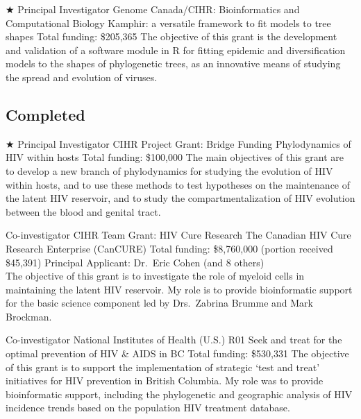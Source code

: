 \documentclass[11pt]{moderncv}
\begin{document}
{$\bigstar$ Principal Investigator}  %
{Genome Canada/CIHR: Bioinformatics and Computational Biology}
{Kamphir: a versatile framework to fit models to tree shapes}
{Total funding: \$205,365}
{
The objective of this grant is the development and validation of a software module in R for fitting epidemic and diversification models to the shapes of phylogenetic trees, as an innovative means of studying the spread and evolution of viruses.\\
}





\vspace{1em}

\subsection {Completed}


{$\bigstar$ Principal Investigator}
{CIHR Project Grant: Bridge Funding}  %
{Phylodynamics of HIV within hosts}
{Total funding: \$100,000}
{
The main objectives of this grant are to develop a new branch of phylodynamics for studying the evolution of HIV within hosts, and to use these methods to test hypotheses on the maintenance of the latent HIV reservoir, and to study the compartmentalization of HIV evolution between the blood and genital tract.\\
}




{Co-investigator}
{CIHR Team Grant: HIV Cure Research}
{The Canadian HIV Cure Research Enterprise (CanCURE)}
{Total funding: \$8,760,000 (portion received \$45,391)}
{
Principal Applicant: Dr.~Eric Cohen (and 8 others)\\
The objective of this grant is to investigate the role of myeloid cells in maintaining the latent HIV reservoir.
My role is to provide bioinformatic support for the basic science component led by Drs.~Zabrina Brumme and Mark Brockman.\\
}

{Co-investigator}
{National Institutes of Health (U.S.) R01}
{Seek and treat for the optimal prevention of HIV \& AIDS in BC}
{Total funding: \$530,331}
{
The objective of this grant is to support the implementation of strategic `test and treat' initiatives for HIV prevention in British Columbia.
My role was to provide bioinformatic support, including the phylogenetic and geographic analysis of HIV incidence trends based on the population HIV treatment database.\\
}
\end{document}
